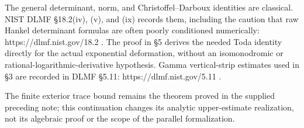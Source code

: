 \documentclass[
  11pt,
]{article}
\begin{document}
The general determinant, norm, and Christoffel--Darboux identities are
classical. NIST DLMF §18.2(iv), (v), and (ix) records them, including
the caution that raw Hankel determinant formulas are often poorly
conditioned numerically: https://dlmf.nist.gov/18.2 . The proof in §5
derives the needed Toda identity directly for the actual exponential
deformation, without an isomonodromic or rational-logarithmic-derivative
hypothesis. Gamma vertical-strip estimates used in §3 are recorded in
DLMF §5.11: https://dlmf.nist.gov/5.11 .

The finite exterior trace bound remains the theorem proved in the
supplied preceding note; this continuation changes its analytic
upper-estimate realization, not its algebraic proof or the scope of the
parallel formalization.
\end{document}
